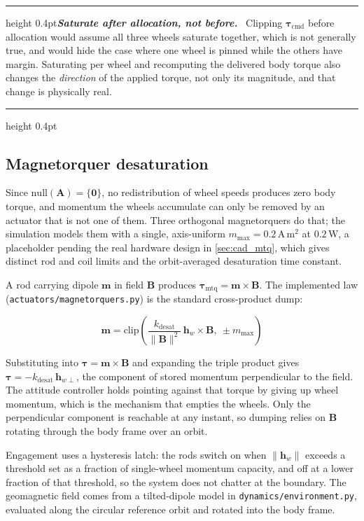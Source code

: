 \documentclass[conference,10pt,a4paper]{IEEEtran}
\newcommand{\remarkrule}{\par\nobreak\vspace{2pt}%
  \hrule height 0.4pt\vspace{4pt}\nobreak}
\newenvironment{designbox}[1][Design decision]
  {\par\medskip\remarkrule\noindent\small\textbf{\textit{#1.}}\ \ignorespaces}
  {\par\vspace{3pt}\hrule height 0.4pt\par\medskip\ignorespacesafterend}
\newenvironment{eqbox}{\ignorespaces}{\ignorespacesafterend}
\newcommand{\vect}[1]{\bm{#1}}
\newcommand{\mat}[1]{\bm{#1}}
\newcommand{\unit}[1]{\ensuremath{\,\mathrm{#1}}}
\begin{document}
\begin{designbox}[Saturate after allocation, not before]
Clipping $\vect{\tau}_\text{cmd}$ before allocation would assume all three
wheels saturate together, which is not generally true, and would hide the case
where one wheel is pinned while the others have margin. Saturating per wheel
and recomputing the delivered body torque also changes the \emph{direction} of
the applied torque, not only its magnitude, and that change is physically real.
\end{designbox}

\subsection{Magnetorquer desaturation}
\label{sec:desat}

Since $\mathrm{null}(\mat{A})=\{\vect{0}\}$, no redistribution of wheel speeds
produces zero body torque, and momentum the wheels accumulate can only be
removed by an actuator that is not one of them. Three orthogonal magnetorquers
do that; the simulation models them with a single, axis-uniform
$m_\text{max}=0.2\unit{A\,m^2}$ at $0.2\unit{W}$, a placeholder pending the
real hardware design in \cref{sec:cad_mtq}, which gives distinct rod and coil
limits and the orbit-averaged desaturation time constant.

A rod carrying dipole $\vect{m}$ in field $\vect{B}$ produces
$\vect{\tau}_\text{mtq}=\vect{m}\times\vect{B}$. The implemented law
(\texttt{actuators/magnetorquers.py}) is the standard cross-product dump:

\begin{eqbox}
\begin{equation}
\vect{m} = \mathrm{clip}\!\left(\frac{k_\text{desat}}{\|\vect{B}\|^2}\,
\vect{h}_w\times\vect{B},\ \pm m_\text{max}\right)
\label{eq:mtqlaw}
\end{equation}
\end{eqbox}

Substituting into $\vect{\tau}=\vect{m}\times\vect{B}$ and expanding the triple
product gives $\vect{\tau} = -k_\text{desat}\,\vect{h}_{w\perp}$, the component
of stored momentum perpendicular to the field. The attitude controller holds
pointing against that torque by giving up wheel momentum, which is the
mechanism that empties the wheels. Only the perpendicular component is
reachable at any instant, so dumping relies on $\vect{B}$ rotating through the
body frame over an orbit.

Engagement uses a hysteresis latch: the rods switch on when $\|\vect{h}_w\|$
exceeds a threshold set as a fraction of single-wheel momentum capacity, and
off at a lower fraction of that threshold, so the system does not chatter at
the boundary. The geomagnetic field comes from a tilted-dipole model in
\texttt{dynamics/environment.py}, evaluated along the circular reference orbit
and rotated into the body frame.
\end{document}
